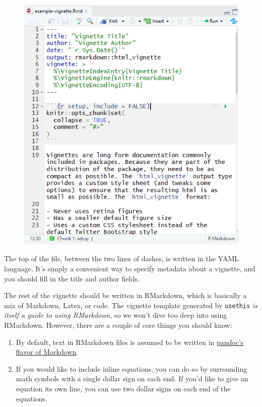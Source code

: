 \documentclass[]{book}
\providecommand{\tightlist}{%
  \setlength{\itemsep}{0pt}\setlength{\parskip}{0pt}}
\begin{document}
\begin{figure}
\centering
\includegraphics{images/packageSS/vignette1.PNG}
\caption{}
\end{figure}

The top of the file, between the two lines of dashes, is written in the
YAML language. It's simply a convenient way to specify metadata about a
vignette, and you should fill in the title and author fields.

The rest of the vignette should be written in RMarkdown, which is
basically a mix of Markdown, Latex, or code. The vignette template
generated by \texttt{usethis} \emph{is itself a guide to using
RMarkdown}, so we won't dive too deep into using RMarkdown. However,
there are a couple of core things you should know:

\begin{enumerate}
\def\labelenumi{\arabic{enumi}.}
\tightlist
\item
  By default, text in RMarkdown files is assumed to be written in
  \href{http://pandoc.org/MANUAL.html}{pandoc's flavor of Markdown}.
\item
  If you would like to include inline equations, you can do so by
  surrounding math symbols with a single dollar sign on each end. If
  you'd like to give an equation its own line, you can use two dollar
  signs on each end of the equations.
\end{enumerate}
\end{document}

